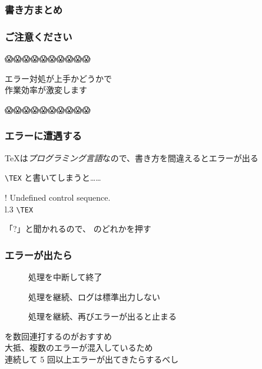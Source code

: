 \begin{frame}[fragile]
	\frametitle{書き方まとめ}
	
\end{frame}


\begin{frame}
	\centering\nishikifont
	\frametitle{ご注意ください}
	\centering\LARGE
	😱😱😱😱😱😱😱😱😱😱
	
	エラー対処が上手かどうかで\\
	作業効率が激変します
	
	😱😱😱😱😱😱😱😱😱😱
\end{frame}

\begin{frame}[fragile]
	\frametitle{エラーに遭遇する}
	\TeX は\emph{プログラミング言語}なので、書き方を間違えるとエラーが出る
	
	\verb+\TEX+ と書いてしまうと……
	
	\pause
	\bgroup\errorfont
	\begin{tabbing}
		! Undefined control sequence.\\
		l.3 \verb+\TEX+\\
	\end{tabbing}
	\egroup
	\pause
	「{\errorfont ?}」と聞かれるので、  \Return のどれかを押す
\end{frame}

\begin{frame}[fragile]
	\frametitle{エラーが出たら}
	\begin{description}
		\item[] 処理を中断して終了
		\item[] 処理を継続、ログは標準出力しない
		\item[\Return] 処理を継続、再びエラーが出ると止まる
	\end{description}
	
	\Return を数回連打するのがおすすめ\\
	{\footnotesize 大抵、複数のエラーが混入しているため}\\
	連続して 5 回以上エラーが出てきたらするべし
\end{frame}


